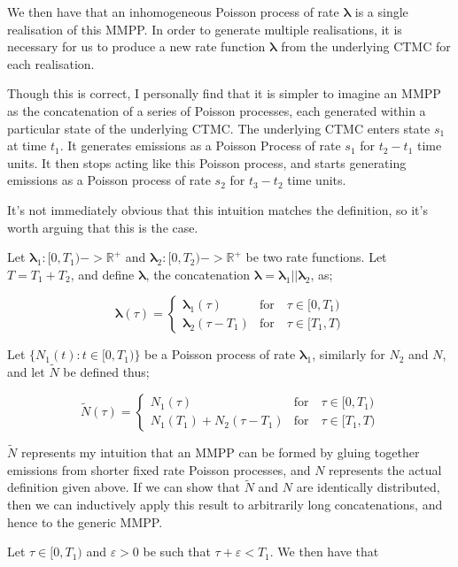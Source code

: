We then have that an inhomogeneous Poisson process of rate $\bm{\lambda}$ is a single realisation of this MMPP. In order to generate multiple realisations, it is necessary for us to produce a new rate function $\bm{\lambda}$ from the underlying CTMC for each realisation.

Though this is correct, I personally find that it is simpler to imagine an MMPP as the concatenation of a series of Poisson processes, each generated within a particular state of the underlying CTMC. The underlying CTMC enters state $s_1$ at time $t_1$. It generates emissions as a Poisson Process of rate $s_1$ for $t_2-t_1$ time units. It then stops acting like this Poisson process, and starts generating emissions as a Poisson process of rate $s_2$ for $t_3-t_2$ time units.

It's not immediately obvious that this intuition matches the definition, so it's worth arguing that this is the case.

Let $\bm{\lambda}_1: [0,T_1) -> \mathbb{R}^{+}$ and $\bm{\lambda}_2:[0,T_2) -> \mathbb{R}^{+}$ be two rate functions. Let $T = T_1 + T_2$, and define $\bm{\lambda}$, the concatenation $\bm{\lambda} = \bm{\lambda}_1 || \bm{\lambda}_2$, as;

$$
\bm{\lambda}(\tau) = 
\begin{cases}
	\bm{\lambda}_1(\tau) & \mbox{for} \quad \tau \in [0,T_1)\\
	\bm{\lambda}_2(\tau-T_1) & \mbox{for} \quad \tau \in [T_1,T)
\end{cases}
$$

Let $\{N_1(t) : t \in [0,T_1)\}$ be a Poisson process of rate $\bm{\lambda}_1$, similarly for $N_2$ and $N$, and let $\widetilde{N}$ be defined thus;

$$
\widetilde{N}(\tau) = 
\begin{cases}
	N_1(\tau) & \mbox{for} \quad \tau \in [0,T_1)\\
	N_1(T_1) + N_2(\tau-T_1) & \mbox{for} \quad \tau \in [T_1,T)
\end{cases}
$$

$\widetilde{N}$ represents my intuition that an MMPP can be formed by gluing together emissions from shorter fixed rate Poisson processes, and $N$ represents the actual definition given above. If we can show that $\widetilde{N}$ and $N$ are identically distributed, then we can inductively apply this result to arbitrarily long concatenations, and hence to the generic MMPP.

Let $\tau \in [0,T_1)$ and $\varepsilon>0$ be such that $\tau + \varepsilon < T_1$. We then have that

